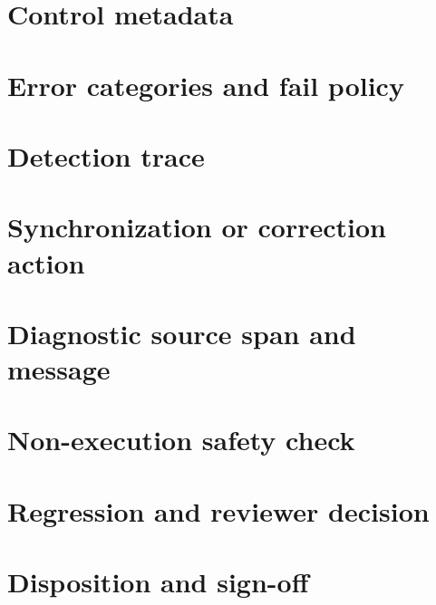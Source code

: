 \documentclass[11pt,letterpaper]{article}
\begin{document}
\makedoctitle\makedocsummary
\section{Control metadata}
\section{Error categories and fail policy}
\section{Detection trace}
\section{Synchronization or correction action}
\section{Diagnostic source span and message}
\section{Non-execution safety check}
\section{Regression and reviewer decision}
\section{Disposition and sign-off}
\end{document}
